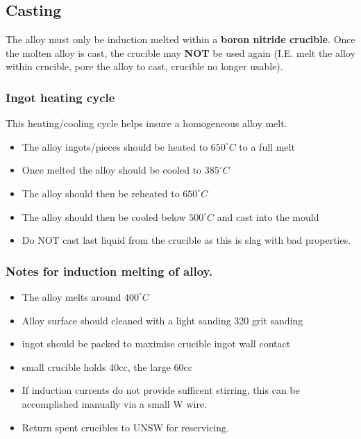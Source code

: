 \subsection{Casting}

The \MgZnCa alloy must only be induction melted within a \textbf{boron nitride crucible}. Once the molten alloy is cast, the crucible may \textbf{NOT} be used again (I.E. melt the alloy within crucible, pore the alloy to cast, crucible no longer usable). 

\subsubsection{Ingot heating cycle}

This heating/cooling cycle helps insure a homogeneous alloy melt.
\begin{itemize}
\item The \MgZnCa  alloy ingots/pieces should be heated to $650^{\circ}C$ to a full melt
\item Once melted the alloy should be cooled to $385^{\circ}C$
\item The alloy should then be reheated to $650^{\circ}C$
\item The alloy should then be cooled below $500^{\circ}C$ and cast into the mould
\item Do NOT cast last liquid from the crucible as this is slag with bad properties. 
\end{itemize}

\subsubsection{Notes for induction melting of \MgZnCa alloy.}
\begin{itemize}
\item The \MgZnCa alloy melts around $400^{\circ}C$
\item Alloy surface should cleaned with a light sanding 320 grit sanding
\item ingot should be packed to maximise crucible ingot wall contact
\item small crucible holds 40cc, the large 60cc
\item If induction currents do not provide sufficent stirring, this can be accomplished manually via a small W wire. 
\item Return spent crucibles to UNSW for reservicing. 
\end{itemize}